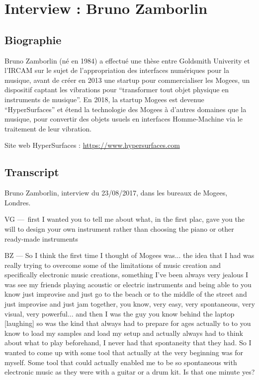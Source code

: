 \chapter{Interview : Bruno Zamborlin}
\label{appendix:zamborlin}

\section*{Biographie}
\noindent Bruno Zamborlin (né en 1984) a effectué une thèse entre Goldsmith Univerity et l'IRCAM sur le sujet de l'appropriation des interfaces numériques pour la musique, avant de créer en 2013 une startup pour commercialiser les Mogees, un dispositif captant les vibrations pour ``transformer tout objet physique en instruments de musique''. En 2018, la startup Mogees est devenue ``HyperSurfaces'' et étend la technologie des Mogees à d'autres domaines que la musique, pour convertir des objets usuels en interfaces Homme-Machine via le traitement de leur vibration.

\noindent Site web HyperSurfaces : \url{https://www.hypersurfaces.com}

\section*{Transcript}

\noindent Bruno Zamborlin, interview du 23/08/2017, dans les bureaux de Mogees, Londres.

VG — first I wanted you to tell me about what, in the first plac, gave you the will to design your own instrument rather than choosing the piano or other ready-made instruments 

BZ — So I think the first time I thought of Mogees was... the idea that I had was really trying to overcome some of the limitations of music creation and specifically electronic music creations, something I've been always very jealous I was see my friends playing acoustic or electric instruments and being able to you know just improvise and just go to the beach or to the middle of the street and just improvise and just jam together, you know, very easy, very spontaneous, very visual, very powerful... and then I was the guy you know behind the laptop [laughing] so was the kind that always had to prepare for ages actually to to you know to load my samples and load my setup and actually always had to think about what to play beforehand, I never had that spontaneity that they had. So I wanted to come up with some tool that actually at the very beginning was for myself. Some tool that could actually enabled me to be so spontaneous with electronic music as they were with a guitar or a drum kit. Is that one minute yes? 

